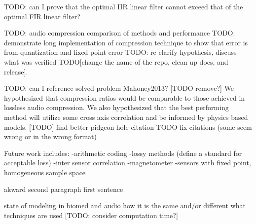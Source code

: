 \documentclass[journal]{IEEEtran}
\begin{document}
TODO: can I prove that the optimal IIR linear filter cannot exceed that of the optimal FIR linear filter?

TODO: audio compression comparison of methods and performance
TODO: demonstrate long implementation of compression technique to show that error is from quantization and fixed point error
TODO: re clarify hypothesis, discuss what was verified
TODO[change the name of the repo, clean up docs, and release]. 

TODO: can I reference solved problem Mahoney2013?
[TODO remove?]  We hypothesized that compression ratios would be comparable to those achieved in lossless audio compression. We also hypothesized that the best performing method will utilize some cross axis correlation and be informed by physics based models.
[TODO] find better pidgeon hole citation
TODO fix citations (some seem wrong or in the wrong format)

Future work includes:
-arithmetic coding
-lossy methods (define a standard for acceptable loss)
-inter sensor correlation
-magnetometer
-sensors with fixed point, homogeneous sample space

akward second paragraph first sentence

state of modeling in biomed and audio
how it is the same and/or different
what techniques are used
[TODO: consider computation time?]
\end{document}
